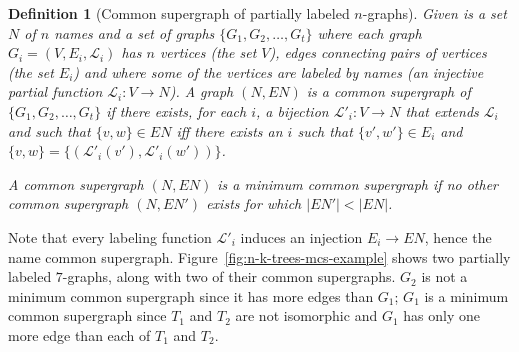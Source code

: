 \documentclass{tlp}
\renewcommand{\|}{\ensuremath{\,|\,}}
\newtheorem{definition}{Definition}
\renewcommand{\|}{\,|\,}
\begin{document}
\begin{definition}[Common supergraph of partially labeled $n$-graphs]
  Given is a set $N$ of $n$ names and a set of graphs
  $\{G_1,G_2,\ldots,G_t\}$ where each graph $G_i= (V, E_i, \mathcal
  L_i)$ has $n$ vertices (the set $V$), edges connecting pairs of
  vertices (the set $E_i$) and where some of the vertices are labeled by
  names (an injective partial function $\mathcal L_i: V \rightarrow
  N$).
%
  A graph $(N,EN)$ is a {\em common supergraph} of
  $\{G_1,G_2,\ldots,G_t\}$ if there exists, for each $i$, a bijection
  $\mathcal L'_i: V \rightarrow N$ that extends $\mathcal L_i$ and
  such that %
  $\{v,w\} \in EN$ iff there exists an $i$ such that $\{v',w'\} \in
  E_i$ and $\{v,w\} =\{(\mathcal L'_i(v'),  \mathcal L'_i(w')) \}$.

  A common supergraph $(N,EN)$ is a {\em minimum} common supergraph if
  no other common supergraph $(N,EN')$ exists for which $|EN'| < |EN|$.
\end{definition}

Note that every labeling function $\mathcal L'_i$ induces an injection
$E_i\to EN$, hence the name common supergraph.
%
Figure~\ref{fig:n-k-trees-mcs-example} shows two partially labeled
$7$-graphs, along with two of their common supergraphs. $G_2$ is not a
minimum common supergraph since it has more edges than $G_1$; $G_1$ is
a minimum common supergraph since $T_1$ and $T_2$ are not
isomorphic and $G_1$ has only one more edge than each of $T_1$ and
$T_2$.
\end{document}
